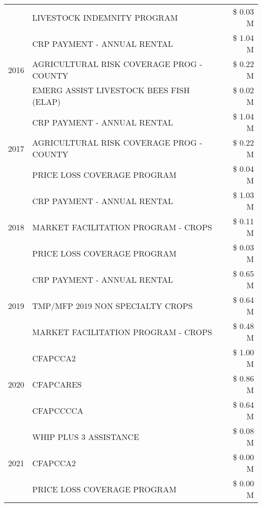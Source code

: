 \begin{tabular}{llr}
 & LIVESTOCK INDEMNITY PROGRAM & \$ 0.03 M \\
\cline{1-3}
\multirow[t]{3}{*}{2016} & CRP PAYMENT - ANNUAL RENTAL & \$ 1.04 M \\
 & AGRICULTURAL RISK COVERAGE PROG - COUNTY & \$ 0.22 M \\
 & EMERG ASSIST LIVESTOCK BEES FISH (ELAP) & \$ 0.02 M \\
\cline{1-3}
\multirow[t]{3}{*}{2017} & CRP PAYMENT - ANNUAL RENTAL & \$ 1.04 M \\
 & AGRICULTURAL RISK COVERAGE PROG - COUNTY & \$ 0.22 M \\
 & PRICE LOSS COVERAGE PROGRAM & \$ 0.04 M \\
\cline{1-3}
\multirow[t]{3}{*}{2018} & CRP PAYMENT - ANNUAL RENTAL & \$ 1.03 M \\
 & MARKET FACILITATION PROGRAM - CROPS & \$ 0.11 M \\
 & PRICE LOSS COVERAGE PROGRAM & \$ 0.03 M \\
\cline{1-3}
\multirow[t]{3}{*}{2019} & CRP PAYMENT - ANNUAL RENTAL & \$ 0.65 M \\
 & TMP/MFP 2019 NON SPECIALTY CROPS & \$ 0.64 M \\
 & MARKET FACILITATION PROGRAM - CROPS & \$ 0.48 M \\
\cline{1-3}
\multirow[t]{3}{*}{2020} & CFAPCCA2 & \$ 1.00 M \\
 & CFAPCARES & \$ 0.86 M \\
 & CFAPCCCCA & \$ 0.64 M \\
\cline{1-3}
\multirow[t]{3}{*}{2021} & WHIP PLUS 3 ASSISTANCE & \$ 0.08 M \\
 & CFAPCCA2 & \$ 0.00 M \\
 & PRICE LOSS COVERAGE PROGRAM & \$ 0.00 M \\
\cline{1-3}
\bottomrule
\end{tabular}
